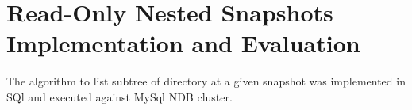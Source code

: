 
%
%
%


\chapter{Read-Only Nested Snapshots Implementation and Evaluation}
\label{ch:RORLSSIE}
The algorithm to list subtree of directory at a given snapshot was implemented in SQl and executed against MySql NDB cluster. 
